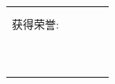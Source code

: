 \documentclass[11pt] {article}
\begin{document}
\begin{table}[!htbp]
\begin{tabular}{|c|l|c|l|c|l|c|l|c|}
		\multicolumn{5}{|l|}{\multirow{2}{*}{}}\\\multicolumn{5}{|c|}{}\\	
		\hline
		\multicolumn{5}{|l|}{\multirow{2}{*}{获得荣誉:}}\\\multicolumn{5}{|c|}{}\\	
		\hline
		\multicolumn{5}{|l|}{\multirow{2}{*}{}}\\\multicolumn{5}{|c|}{}\\	
		\multicolumn{5}{|l|}{\multirow{2}{*}{}}\\\multicolumn{5}{|c|}{}\\	
		\multicolumn{5}{|l|}{\multirow{2}{*}{}}\\\multicolumn{5}{|c|}{}\\	
		\multicolumn{5}{|l|}{\multirow{2}{*}{}}\\\multicolumn{5}{|c|}{}\\	
		\multicolumn{5}{|l|}{\multirow{2}{*}{}}\\\multicolumn{5}{|c|}{}\\	
	\hline
	\hline
	\end{tabular}
\end{table}


 
\end{document}

